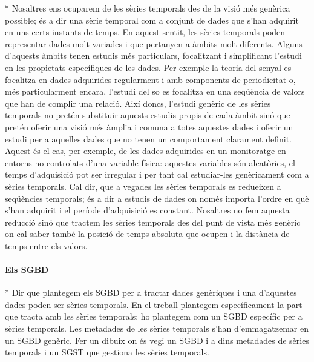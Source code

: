 * Nosaltres ens ocuparem de les sèries temporals des de la visió més
  genèrica possible; és a dir una sèrie temporal com a conjunt de
  dades que s'han adquirit en uns certs instants de temps.  En aquest
  sentit, les sèries temporals poden representar dades molt variades i
  que pertanyen a àmbits molt diferents. Alguns d'aquests àmbits tenen
  estudis més particulars, focalitzant i simplificant l'estudi en les
  propietats específiques de les dades. Per exemple la teoria del
  senyal es focalitza en dades adquirides regularment i amb components
  de periodicitat o, més particularment encara, l'estudi del so es
  focalitza en una seqüència de valors que han de complir una relació.
  Així doncs, l'estudi genèric de les sèries temporals no pretén
  substituir aquests estudis propis de cada àmbit sinó que pretén
  oferir una visió més àmplia i comuna a totes aquestes dades i oferir
  un estudi per a aquelles dades que no tenen un comportament
  clarament definit. Aquest és el cas, per exemple, de les dades
  adquirides en un monitoratge en entorns no controlats d'una variable
  física: aquestes variables són aleatòries, el temps d'adquisició pot
  ser irregular i per tant cal estudiar-les genèricament com a sèries
  temporals.  Cal dir, que a vegades les sèries temporals es redueixen
  a seqüències temporals; és a dir a estudis de dades on només importa
  l'ordre en què s'han adquirit i el període d'adquisició es
  constant. Nosaltres no fem aquesta reducció sinó que tractem les
  sèries temporals des del punt de vista més genèric on cal saber
  també la posició de temps absoluta que ocupen i la distància de
  temps entre els valors.





\paragraph{Els \gls{SGBD}}

* Dir que plantegem els SGBD per a tractar dades genèriques i una d'aquestes dades poden ser sèries temporals. En el treball plantegem específicament la part que tracta amb les sèries temporals: ho plantegem com un SGBD específic per a sèries temporals. Les metadades de les sèries temporals s'han d'emmagatzemar en un SGBD genèric. Fer un dibuix on és vegi un SGBD i a dins metadades de sèries temporals i un SGST que gestiona les sèries temporals.

